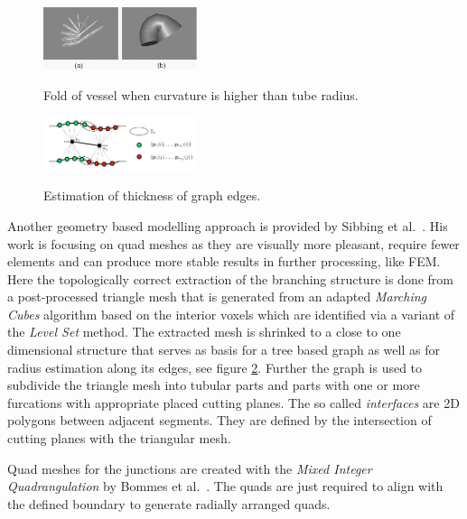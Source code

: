 \begin{figure}[h]
	\centering
	\includegraphics[width=0.4\textwidth]{./Images/Fold_of_vessel.png} \\
	\caption{Fold of vessel when curvature is higher than tube radius.}
	\cite{volkau2005geometric}
	\label{fig:Fold_of_vessel}
\end{figure}

\begin{figure}[h]
	\centering
	\includegraphics[width=0.4\textwidth]{./Images/Estimate_thickness.png} \\
	\caption{Estimation of thickness of graph edges.}
	\cite{sibbing2012topology}
	\label{fig:Estimate_thickness}
\end{figure}

Another geometry based modelling approach is provided by Sibbing et al.~\cite{sibbing2012topology}.
His work is focusing on quad meshes as they are visually more pleasant, require fewer elements and can produce more stable results in further processing, like FEM. Here the topologically correct extraction of the branching structure is done from a post-processed triangle mesh that is generated from an adapted \emph{Marching Cubes} algorithm based on the interior voxels which are identified via a variant of the \emph{Level Set} method. The extracted mesh is shrinked to a close to one dimensional structure that serves as basis for a tree based graph as well as for radius estimation along its edges, see figure \ref{fig:Estimate_thickness}. Further the graph is used to subdivide the triangle mesh into tubular parts and parts with one or more furcations with appropriate placed cutting planes. The so called \emph{interfaces} are 2D polygons between adjacent segments. They are defined by the intersection of cutting planes with the triangular mesh. 

Quad meshes for the junctions are created with the \emph{Mixed Integer Quadrangulation} by Bommes et al.~\cite{bommes2009mixed}. The quads are just required to align with the defined boundary to generate radially arranged quads.

